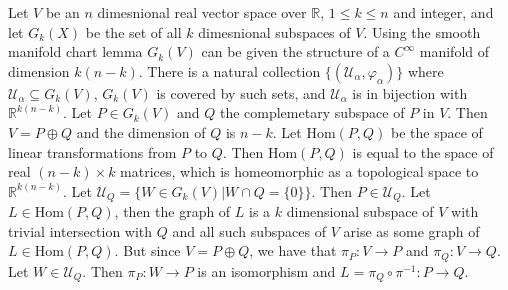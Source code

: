         \begin{example}
            Let $V$ be an $n$ dimesnional real vector space over $\mathbb{R}$,
            $1\leq{k}\leq{n}$ and integer, and let $G_{k}(X)$ be the set of
            all $k$ dimesnional subspaces of $V$. Using the smooth manifold
            chart lemma $G_{k}(V)$ can be given the structure of a $C^{\infty}$
            manifold of dimension $k(n-k)$. There is a natural collection
            $\{(\mathcal{U}_{\alpha},\varphi_{\alpha})\}$ where
            $\mathcal{U}_{\alpha}\subseteq{G}_{k}(V)$, $G_{k}(V)$ is covered by
            such sets, and $\mathcal{U}_{\alpha}$ is in bijection with
            $\mathbb{R}^{k(n-k)}$. Let $P\in{G}_{k}(V)$ and $Q$ the complemetary
            subspace of $P$ in $V$. Then $V=P\oplus{Q}$ and the dimension of $Q$
            is $n-k$. Let $\textrm{Hom}(P,Q)$ be the space of linear
            transformations from $P$ to $Q$. Then $\textrm{Hom}(P,Q)$ is equal
            to the space of real $(n-k)\times{k}$ matrices, which is
            homeomorphic as a topological space to $\mathbb{R}^{k(n-k)}$. Let
            $\mathcal{U}_{Q}=\{W\in{G}_{k}(V)|W\cap{Q}=\{0\}\}$. Then
            $P\in\mathcal{U}_{Q}$. Let $L\in\textrm{Hom}(P,Q)$, then the graph
            of $L$ is a $k$ dimensional subspace of $V$ with trivial
            intersection with $Q$ and all such subspaces of $V$ arise as some
            graph of $L\in\textrm{Hom}(P,Q)$. But since $V=P\oplus{Q}$, we have
            that $\pi_{P}:V\rightarrow{P}$ and $\pi_{Q}:V\rightarrow{Q}$. Let
            $W\in\mathcal{U}_{Q}$. Then $\pi_{P}:W\rightarrow{P}$ is an
            isomorphism and $L=\pi_{Q}\circ\pi^{\minus{1}}:P\rightarrow{Q}$.
        \end{example}
